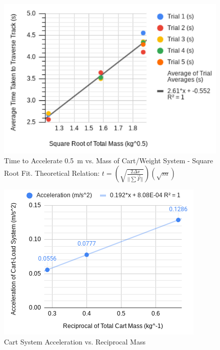 \documentclass[reprint,amsmath,amssymb,aps]{revtex4-2}
\begin{document}
\begin{figure} %
\begin{center}
\includegraphics[width=\columnwidth]{Time vs. Mass (Square Root Fit).png}
\end{center}
\caption{Time to Accelerate \qty{0.5}{\meter} vs. Mass of Cart/Weight System - Square Root Fit. Theoretical Relation: $t=(\sqrt{\frac{2\Delta x}{||\sum\vec{F}||}})(\sqrt{m})$}
\label{fig:3}
\end{figure}

\begin{figure}
\begin{center}
\includegraphics[width=\columnwidth]{Acceleration vs. Reciprocal Mass.png}
\end{center}
\caption{Cart System Acceleration vs. Reciprocal Mass}
\label{fig:4sqrootfit}
\end{figure}
\end{document}
